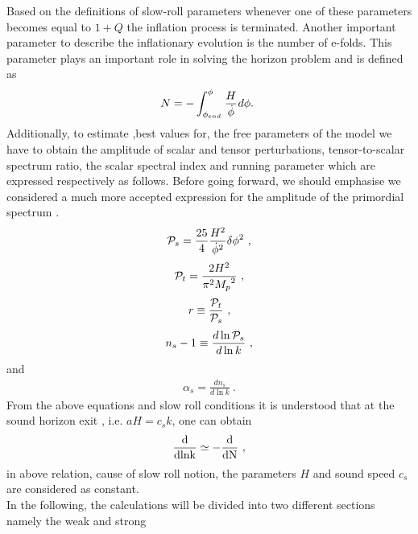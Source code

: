 \documentclass[12pt]{revtex4}
\begin{document}
Based on the definitions of slow-roll parameters  whenever one of these parameters becomes equal to  $1+Q$ the inflation process is terminated. Another important parameter to describe the inflationary
evolution is the number of e-folds. This parameter plays an important role in solving the horizon problem and  is defined as
\begin{equation}
N =  - \int_{{\phi _{end}}}^\phi  {\mkern 1mu}  \frac{H}{{\dot \phi }}{\mkern 1mu} d\phi.~\label{Nefold}
\end{equation}
Additionally, to estimate ,best values for, the free parameters of the model we have to obtain the amplitude of scalar and tensor perturbations, tensor-to-scalar spectrum ratio, the scalar spectral index and running parameter which are expressed respectively as follows.
{Before going forward, we should emphasise  we considered a much more accepted expression for the amplitude of the primordial spectrum \cite{MB, MMV}.}
\begin{equation}
{{\cal P}_s}  = \frac{{25}}{4}\frac{{{H^2}}}{{{{\dot \phi }^2}}}\delta {\phi ^2}~,\label{ps}
\end{equation}
\begin{equation}
{{\cal P}_t}  =  \frac{{2{H^2}}}{{{\pi ^2}{M_p}^2}}~,\label{pt}
\end{equation}
\begin{equation}
\label{rratio}
r \equiv \frac{{{{\cal P}_t}}}{{{{\cal P}_s}}}~,
\end{equation}
\begin{equation}
\label{ns}
{n_s} - 1 \equiv \frac{{d\ln {{\cal P}_s}}}{{d\ln k}}~,
\end{equation}
and
\begin{eqnarray}
\label{dnsk}
\alpha_s=\frac{{d{n_s}}}{{d\ln k}}~.
\end{eqnarray}
From the above equations and slow roll conditions  it {is understood}  that at the sound horizon exit , i.e. $aH = c_s k$, one can obtain \cite{Unn13}
\begin{equation}
\label{exithorizon}
\frac{{\rm{d}}}{{{\rm{d ln k}}}} \simeq -\frac{{\rm{d}}}{{{\rm{dN}}}}~,
\end{equation}
in above relation, cause of slow roll notion, the parameters $H$  and  sound speed $c_s$ are considered as constant.\\
In the following, the calculations will be divided  into two different sections namely the weak and strong
\end{document}
